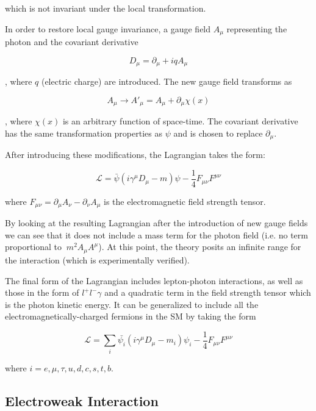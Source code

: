 which is not invariant under the local transformation.

In order to restore local gauge invariance, a gauge field $A_{\mu}$ representing the photon and the covariant derivative 

\begin{equation}
D_{\mu} = \partial_{\mu} + iq A_{\mu}
\end{equation} 

, where $q$ (electric charge) are introduced. The new gauge field transforms as

\begin{equation}
A_{\mu}\rightarrow A'_{\mu} = A_{\mu} + \partial_{\mu}\chi(x)
\end{equation}

, where $\chi(x)$ is an arbitrary function of space-time. The covariant derivative has the same transformation properties as $\psi$ and is chosen to replace $\partial_{\mu}$.

After introducing these modifications, the Lagrangian takes the form:

\begin{equation}
\mathcal{L} = \bar{\psi}(i\gamma^{\mu}D_{\mu}-m)\psi - \frac{1}{4}F_{\mu\nu}F^{\mu\nu}
\end{equation}

where $F_{\mu\nu}= \partial_{\mu}A_{\nu} - \partial_{\nu}A_{\mu}$ is the electromagnetic field strength tensor. 

By looking at the resulting Lagrangian after the introduction of new gauge fields we can see that it does not include a mass term for the photon field (i.e. no term proportional to $~m^{2}A_{\mu}A^{\mu}$). At this point, the theory posits an infinite range for the interaction (which is experimentally verified).

The final form of the Lagrangian includes lepton-photon interactions, as well as those in the form of $l^{+}l^{-}\gamma$ and a quadratic term in the field strength tensor which is the photon kinetic energy. It can be generalized to include all the electromagnetically-charged fermions in the SM by taking the form

\begin{equation}
\mathcal{L} = \sum_{i}\bar{\psi_{i}}(i\gamma^{\mu}D_{\mu}-m_{i})\psi_{i} - \frac{1}{4}F_{\mu\nu}F^{\mu\nu}
\end{equation}

where $i=e,\mu,\tau,u,d,c,s,t,b$.

\subsection{Electroweak Interaction}

